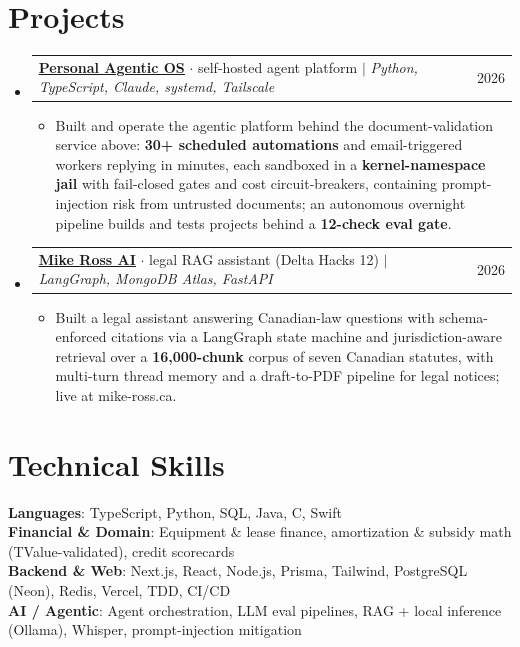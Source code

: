 \documentclass[letterpaper,11pt]{article}
\makeatletter
\newcommand{\resumeItem}[1]{
  \item\small{
    {#1\vspace{-2pt}}
  }
}
\newcommand{\resumeProjectHeading}[2]{
    \item
    \begin{tabular*}{0.97\textwidth}{l@{\extracolsep{\fill}}r}
      \small#1 & #2 \\
    \end{tabular*}\vspace{-7pt}
}
\newcommand{\resumeSubHeadingListStart}{\begin{itemize}[leftmargin=0.15in, label={}]}
\newcommand{\resumeSubHeadingListEnd}{\end{itemize}}
\newcommand{\resumeItemListStart}{\begin{itemize}}
\newcommand{\resumeItemListEnd}{\end{itemize}\vspace{-5pt}}
\makeatother
\begin{document}
\section{Projects}
    \resumeSubHeadingListStart
      \resumeProjectHeading
          {\href{https://www.suleyman.io/architecture}{\underline{\textbf{Personal Agentic OS}}} $\cdot$ self-hosted agent platform $|$ \emph{Python, TypeScript, Claude, systemd, Tailscale}}{2026}
          \resumeItemListStart
            \resumeItem{Built and operate the agentic platform behind the document-validation service above: \textbf{30+ scheduled automations} and email-triggered workers replying in minutes, each sandboxed in a \textbf{kernel-namespace jail} with fail-closed gates and cost circuit-breakers, containing prompt-injection risk from untrusted documents; an autonomous overnight pipeline builds and tests projects behind a \textbf{12-check eval gate}.}
          \resumeItemListEnd
      \resumeProjectHeading
          {\href{https://mike-ross.ca/}{\underline{\textbf{Mike Ross AI}}} $\cdot$ legal RAG assistant (Delta Hacks 12) $|$ \emph{LangGraph, MongoDB Atlas, FastAPI}}{2026}
          \resumeItemListStart
            \resumeItem{Built a legal assistant answering Canadian-law questions with schema-enforced citations via a LangGraph state machine and jurisdiction-aware retrieval over a \textbf{16,000-chunk} corpus of seven Canadian statutes, with multi-turn thread memory and a draft-to-PDF pipeline for legal notices; live at mike-ross.ca.}
          \resumeItemListEnd
    \resumeSubHeadingListEnd

\section{Technical Skills}
\begin{itemize}[leftmargin=0.15in, label={}]
    \small{\item{
     \textbf{Languages}{: TypeScript, Python, SQL, Java, C, Swift} \\
     \textbf{Financial \& Domain}{: Equipment \& lease finance, amortization \& subsidy math (TValue-validated), credit scorecards} \\
     \textbf{Backend \& Web}{: Next.js, React, Node.js, Prisma, Tailwind, PostgreSQL (Neon), Redis, Vercel, TDD, CI/CD} \\
     \textbf{AI / Agentic}{: Agent orchestration, LLM eval pipelines, RAG + local inference (Ollama), Whisper, prompt-injection mitigation}
    }}
\end{itemize}
\end{document}
